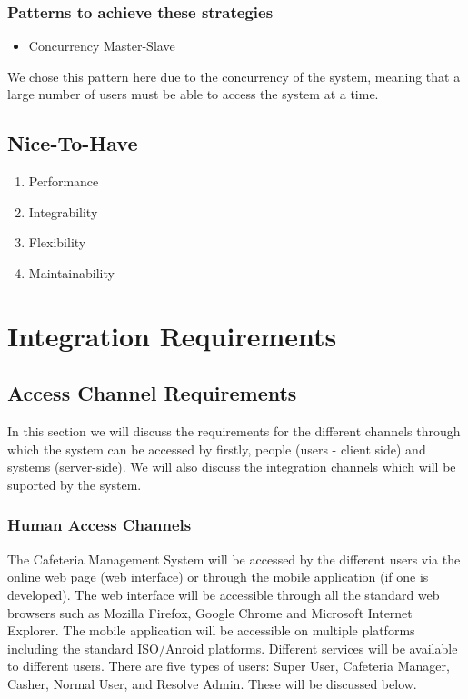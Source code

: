 \documentclass[12pt]{article}
\begin{document}
	\subsubsection{Patterns to achieve these strategies}
	 \begin{itemize}
		\item Concurrency Master-Slave 
	\end{itemize}
We chose this pattern here due to the concurrency of the system, meaning that a large number of users must be able to access the system at a time.
\subsection{Nice-To-Have}
	\begin{enumerate}
		\item Performance
		\item Integrability
		\item Flexibility
		\item Maintainability
\end{enumerate}

\section{Integration Requirements}
\subsection{Access Channel Requirements}
In this section we will discuss the requirements for the different channels through which the system can be accessed by firstly, people (users - client side) and systems (server-side). We will also discuss the integration channels which will be suported by the system.


\subsubsection{Human Access Channels}
The Cafeteria Management System will be accessed by the different users via the online web page (web interface) or through the mobile application (if one is developed). The web interface will be accessible through all the standard web browsers such as Mozilla Firefox, Google Chrome and Microsoft Internet Explorer. The mobile application will be accessible on multiple platforms including the standard ISO/Anroid platforms. Different services will be available to different users. There are five types of users: Super User, Cafeteria Manager, Casher, Normal User, and Resolve Admin. These will be discussed below. \\
\end{document}
